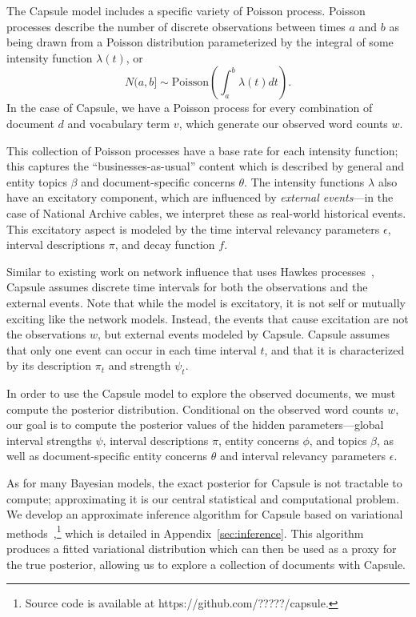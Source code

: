   The Capsule model includes a specific variety of Poisson process.
Poisson processes describe the number of discrete observations between times $a$ and $b$ as being drawn from a Poisson distribution parameterized by the integral of some intensity function $\lambda(t)$, or
\[ N(a,b] \sim \mbox{Poisson}\left(\int_a^b \lambda(t) dt\right). \]
In the case of Capsule, we have a Poisson process for every combination of document $d$ and vocabulary term $v$, which generate our observed word counts $w$.

This collection of Poisson processes have a base rate for each intensity function; this captures the ``businesses-as-usual'' content which is described by general and entity topics $\beta$ and document-specific concerns $\theta$.  The intensity functions $\lambda$ also have an excitatory component, which are influenced by \emph{external events}---in the case of National Archive cables, we interpret these as real-world historical events. This excitatory aspect is modeled by the time interval relevancy parameters $\epsilon$, interval descriptions $\pi$, and decay function $f$.

Similar to existing work on network influence that uses Hawkes processes~\cite{linderman2015scalable,guo2014bayesian}, Capsule assumes discrete time intervals for both the observations and the external events.
Note that while the model is excitatory, it is not self or mutually exciting like the network models.  Instead, the events that cause excitation are not the observations $w$, but external events modeled by Capsule.  Capsule assumes that only one event can occur in each time interval $t$, and that it is characterized by its description $\pi_t$ and strength $\psi_t$. 

In order to use the Capsule model to explore the observed documents, we must compute the posterior distribution.  Conditional on the observed word counts $w$, our goal is to compute the posterior values of the hidden parameters---global interval strengths $\psi$, interval descriptions $\pi$, entity concerns $\phi$, and topics $\beta$, as well as document-specific entity concerns $\theta$ and interval relevancy parameters $\epsilon$.

As for many Bayesian models, the exact posterior for Capsule is not tractable to compute; approximating it is our central statistical and computational problem.  We develop an approximate inference algorithm for Capsule based on variational methods~\cite{Wainwright:2008},\footnote{Source code is available at https://github.com/?????/capsule.} which is detailed in Appendix~\ref{sec:inference}. This algorithm produces a fitted variational distribution which can then be used as a proxy for the true posterior, allowing us to explore a collection of documents with Capsule.  


